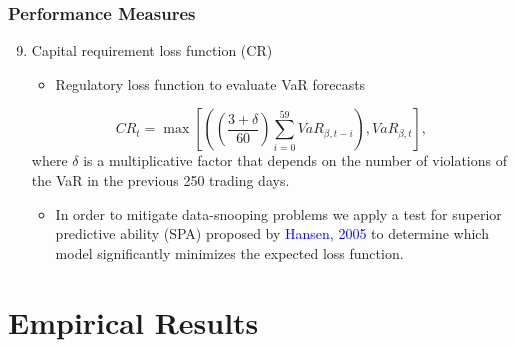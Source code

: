 \documentclass[pdf,10pt,xcolor=dvipsnames,hide notes]{beamer}
\begin{document}
\begin{frame}
\frametitle{Performance Measures}

\begin{enumerate}
	\setcounter{enumi}{8}
	
	\item Capital requirement loss function (CR)
	
	\begin{itemize}
		\item 	Regulatory loss function to evaluate VaR forecasts
	\end{itemize}
	
	\begin{equation}CR_{t} =\max \left [\left (\genfrac{(}{)}{}{}{3 +\delta }{60}\sum _{i =0}^{59}VaR_{\beta  ,t -i}\right ) ,VaR_{\beta  ,t}\right ] ,
	\end{equation}where $\delta $ is a multiplicative factor that depends on the number of violations of the VaR in the previous 250 trading days.
	
	\vspace{0.3cm}
	
		\begin{itemize}
		\item 	In order to mitigate data-snooping problems we apply a test for superior predictive ability (SPA) proposed by \textcolor{blue}{Hansen}, \textcolor{blue}{2005} to determine which model significantly minimizes the expected loss function. 
	\end{itemize}
	
	
\end{enumerate}



\end{frame}

\section{Empirical Results}
\end{document}
